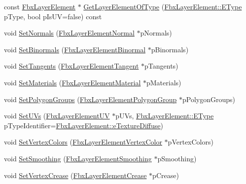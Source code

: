 \begin{DoxyCompactItemize}
\item 
const \hyperlink{class_fbx_layer_element}{Fbx\+Layer\+Element} $\ast$ \hyperlink{class_fbx_layer_a529a1bf508802ecb8f966b65857f96f4}{Get\+Layer\+Element\+Of\+Type} (\hyperlink{class_fbx_layer_element_a8c95c5cd880b56c776acd379bd86f42c}{Fbx\+Layer\+Element\+::\+E\+Type} p\+Type, bool p\+Is\+UV=false) const
\item 
void \hyperlink{class_fbx_layer_a1201a72e048e3da61fc8226872e70f01}{Set\+Normals} (\hyperlink{class_fbx_layer_element_normal}{Fbx\+Layer\+Element\+Normal} $\ast$p\+Normals)
\item 
void \hyperlink{class_fbx_layer_a4b52fae069d3d906ce3699f8231315bf}{Set\+Binormals} (\hyperlink{class_fbx_layer_element_binormal}{Fbx\+Layer\+Element\+Binormal} $\ast$p\+Binormals)
\item 
void \hyperlink{class_fbx_layer_a779a440235a9d059e57464368025e3b0}{Set\+Tangents} (\hyperlink{class_fbx_layer_element_tangent}{Fbx\+Layer\+Element\+Tangent} $\ast$p\+Tangents)
\item 
void \hyperlink{class_fbx_layer_a7fbdddfcc81d225fa2e5abff9fae39a6}{Set\+Materials} (\hyperlink{class_fbx_layer_element_material}{Fbx\+Layer\+Element\+Material} $\ast$p\+Materials)
\item 
void \hyperlink{class_fbx_layer_a6711d6e68215f1385a328df93188aaea}{Set\+Polygon\+Groups} (\hyperlink{class_fbx_layer_element_polygon_group}{Fbx\+Layer\+Element\+Polygon\+Group} $\ast$p\+Polygon\+Groups)
\item 
void \hyperlink{class_fbx_layer_aa0032fabcc4b9a611bf014a14c5777ea}{Set\+U\+Vs} (\hyperlink{class_fbx_layer_element_u_v}{Fbx\+Layer\+Element\+UV} $\ast$p\+U\+Vs, \hyperlink{class_fbx_layer_element_a8c95c5cd880b56c776acd379bd86f42c}{Fbx\+Layer\+Element\+::\+E\+Type} p\+Type\+Identifier=\hyperlink{class_fbx_layer_element_a8c95c5cd880b56c776acd379bd86f42ca09829e6ecf512e7ae04d9ad8de1342fa}{Fbx\+Layer\+Element\+::e\+Texture\+Diffuse})
\item 
void \hyperlink{class_fbx_layer_a2738cda132469cfdf112fa0d8f6fa32e}{Set\+Vertex\+Colors} (\hyperlink{class_fbx_layer_element_vertex_color}{Fbx\+Layer\+Element\+Vertex\+Color} $\ast$p\+Vertex\+Colors)
\item 
void \hyperlink{class_fbx_layer_af8687e2d32aa26d65ca3daf942f0e21b}{Set\+Smoothing} (\hyperlink{class_fbx_layer_element_smoothing}{Fbx\+Layer\+Element\+Smoothing} $\ast$p\+Smoothing)
\item 
void \hyperlink{class_fbx_layer_a3412e33c666589f00a19ac3b0ddc91a3}{Set\+Vertex\+Crease} (\hyperlink{class_fbx_layer_element_crease}{Fbx\+Layer\+Element\+Crease} $\ast$p\+Crease)

\end{DoxyCompactItemize}

